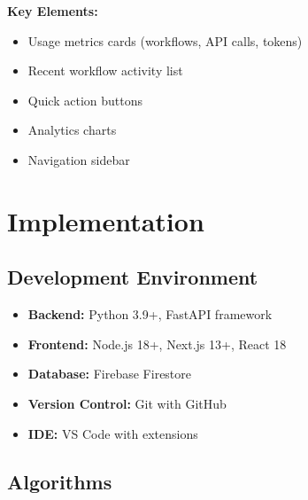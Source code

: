 \documentclass[12pt,a4paper]{article}
\begin{document}
\textbf{Key Elements:}
\begin{itemize}
    \item Usage metrics cards (workflows, API calls, tokens)
    \item Recent workflow activity list
    \item Quick action buttons
    \item Analytics charts
    \item Navigation sidebar
\end{itemize}

\newpage

\section{Implementation}

\subsection{Development Environment}
\begin{itemize}
    \item \textbf{Backend:} Python 3.9+, FastAPI framework
    \item \textbf{Frontend:} Node.js 18+, Next.js 13+, React 18
    \item \textbf{Database:} Firebase Firestore
    \item \textbf{Version Control:} Git with GitHub
    \item \textbf{IDE:} VS Code with extensions
\end{itemize}

\subsection{Algorithms}
\end{document}
